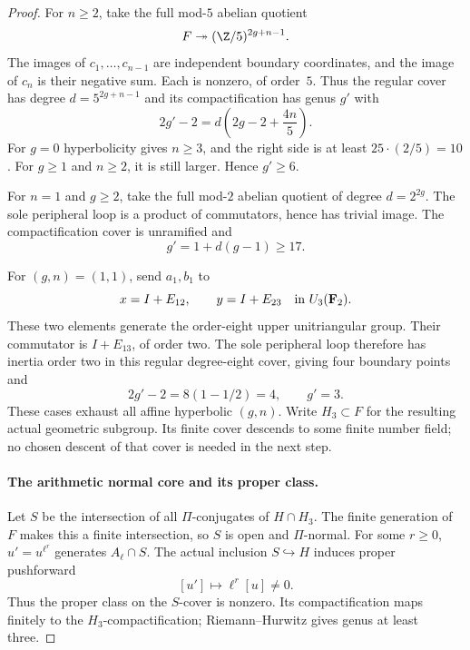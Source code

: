\begin{proof}
For $n\geq2$, take the full mod-$5$ abelian quotient
\[
        F\twoheadrightarrow(\Z/5)^{2g+n-1}.
\]
The images of $c_1,\ldots,c_{n-1}$ are independent
boundary coordinates, and the image of $c_n$ is their
negative sum. Each is nonzero, of order~$5$.
Thus the regular cover has degree $d=5^{2g+n-1}$ and
its compactification has genus $g'$ with
\[
       2g'-2=d\left(2g-2+\frac{4n}{5}\right).
                                                               \tag{GA.1}
\]
For $g=0$ hyperbolicity gives $n\geq3$, and the right
side is at least $25\cdot(2/5)=10$. For $g\geq1$
and $n\geq2$, it is still larger. Hence $g'\geq6$.

For $n=1$ and $g\geq2$, take the full mod-$2$
abelian quotient of degree $d=2^{2g}$. The sole
peripheral loop is a product of commutators, hence
has trivial image. The compactification cover is
unramified and
\[
                    g'=1+d(g-1)\geq17.                    \tag{GA.2}
\]

For $(g,n)=(1,1)$, send $a_1,b_1$ to
\[
 x=I+E_{12},\qquad y=I+E_{23}
                  \quad\hbox{in }U_3(\mathbf F_2).
\]
These two elements generate the order-eight upper
unitriangular group. Their commutator is
$I+E_{13}$, of order two. The sole peripheral
loop therefore has inertia order two in this
regular degree-eight cover, giving four boundary
points and
\[
                  2g'-2=8(1-1/2)=4,
                  \qquad g'=3.                            \tag{GA.3}
\]
These cases exhaust all affine hyperbolic $(g,n)$.
Write $H_3\subset F$ for the resulting actual
geometric subgroup. Its finite cover descends to
some finite number field; no chosen descent of
that cover is needed in the next step.

\paragraph{The arithmetic normal core and its proper class.}
Let $S$ be the intersection of all $\Pi$-conjugates
of $H\cap H_3$. The finite generation of $F$ makes
this a finite intersection, so $S$ is open and
$\Pi$-normal. For some $r\geq0$, $u'=u^{\ell^r}$
generates $A_\ell\cap S$. The actual inclusion
$S\hookrightarrow H$ induces proper pushforward
\[
              [u']\longmapsto\ell^r[u]\ne0.               \tag{GA.4}
\]
Thus the proper class on the $S$-cover is nonzero.
Its compactification maps finitely to the
$H_3$-compactification; Riemann--Hurwitz gives
genus at least three.


\end{proof}
